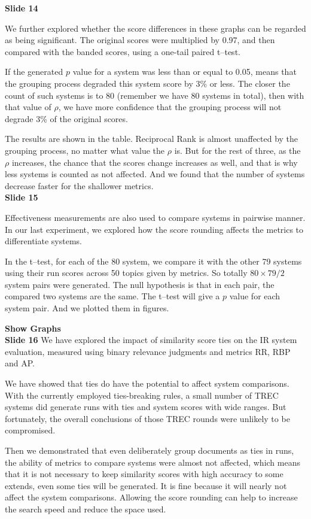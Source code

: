 \documentclass{article}
\begin{document}
\textbf{Slide 14}

We further explored whether the score differences in these graphs can be regarded as being significant. The original scores were multiplied by 0.97, and then compared with the banded scores, using a one-tail paired t--test.

If the generated $p$ value for a system was less than or equal to 0.05, means that the grouping process degraded this system score by 3\% or less. The closer the count of such systems is to 80 (remember we have 80 systems in total), then with that value of $\rho$, we have more confidence that the grouping process will not degrade 3\% of the original scores.

The results are shown in the table. Reciprocal Rank is almost unaffected by the grouping process, no matter what value the $\rho$ is. But for the rest of three, as the $\rho$ increases, the chance that the scores change increases as well, and that is why less systems is counted as not affected. And we found that the number of systems decrease faster for the shallower metrics.\\[1em]

\textbf{Slide 15}

Effectiveness measurements are also used to compare systems in pairwise manner. In our last experiment, we explored how the score rounding affects the metrics to differentiate systems.

In the t--test, for each of the 80 system, we compare it with the other 79 systems using their run scores across 50 topics given by metrics. So totally $80 \times 79/2$ system pairs were generated. The null hypothesis is that in each pair, the compared two systems are the same. The t--test will give a $p$ value for each system pair. And we plotted them in figures.

\textbf{Show Graphs}\\[1em]

\textbf{Slide 16}
We have explored the impact of similarity score ties on the IR system evaluation, measured using binary relevance judgments and metrics RR, RBP and AP.

We have showed that ties do have the potential to affect system comparisons. With the currently employed ties-breaking rules, a small number of TREC systems did generate runs with ties and system scores with wide ranges. But fortunately, the overall conclusions of those TREC rounds were unlikely to be compromised.

Then we demonstrated that even deliberately group documents as ties in runs, the ability of metrics to compare systems were almost not affected, which means that it is not necessary to keep similarity scores with high accuracy to some extends, even some ties will be generated. It is fine because it will nearly not affect the system comparisons. Allowing the score rounding can help to increase the search speed and reduce the space used.
\end{document}

